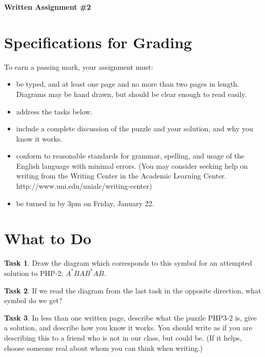 \documentclass[12pt,letterpaper]{article}
\theoremstyle{definition}
\newtheorem{task}{Task}
\begin{document}
\setlength{\parskip}{1ex plus 0.5ex minus 0.2ex}
\setlength{\parindent}{0pt}

\pagestyle{fancy}
\lfoot{} 
\rfoot{} 

\begin{center}
{
\Large
\textbf{Written Assignment \#2}
}
\end{center}


\section*{Specifications for Grading}

To earn a passing mark, your assignment must:
\begin{itemize}
\item be typed, and at least one page and no more than two pages in length. Diagrams
may be hand drawn, but should be clear enough to read easily.
\item address the tasks below.
\item include a complete discussion of the puzzle and your solution, and why you know it works.
\item conform to reasonable standards for grammar, spelling, and usage of the English language with minimal errors. (You may consider seeking help on writing from the Writing Center in the Academic Learning Center. http://www.uni.edu/unialc/writing-center)
\item be turned in by 3pm on Friday, January 22.
\end{itemize}


\section*{What to Do}

\begin{task}
Draw the diagram which corresponds to this symbol for an attempted solution to PHP-2: $A^*BAB^*AB.$
\end{task}

\begin{task}
If we read the diagram from the last task in the opposite direction, what symbol do we get?
\end{task}

\begin{task}
In less than one written page, describe what the puzzle PHP3-2 is, give a solution, and describe how you know it works.
You should write as if you are describing this to a friend who is not in our class, but could be. 
(If it helps, choose someone real about whom you can think when writing.)
\end{task}


\clearpage
\end{document}
